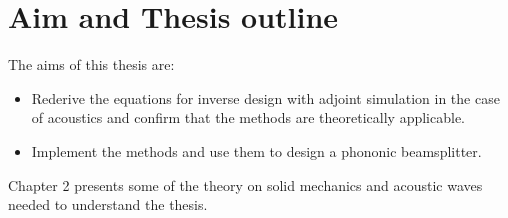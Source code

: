 \section{Aim and Thesis outline}

The aims of this thesis are:
\begin{itemize}
	\item Rederive the equations for inverse design with adjoint simulation in
		the case of acoustics and confirm that the methods are theoretically
		applicable.
	\item Implement the methods and use them to design a phononic beamsplitter.
\end{itemize}

Chapter 2 presents some of the theory on solid mechanics and acoustic waves needed to
understand the thesis.

